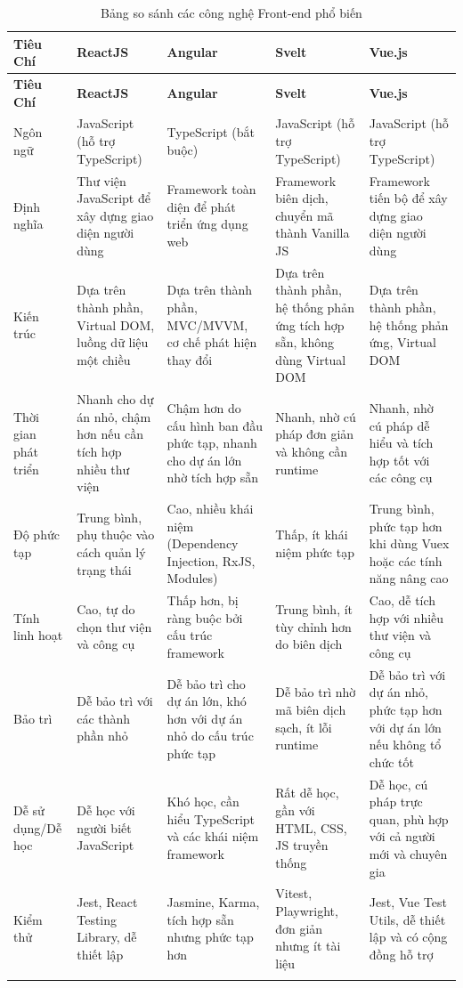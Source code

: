 \begin{enumerate}[(a)]
            \newpage

\begin{landscape}  %
\begin{longtable}{|p{3.5cm}|p{5cm}|p{5cm}|p{5cm}|p{5cm}|}
\hline
\textbf{Tiêu Chí} & \textbf{ReactJS} & \textbf{Angular} & \textbf{Svelt} & \textbf{Vue.js} \\
\hline
\endfirsthead
\hline
\textbf{Tiêu Chí} & \textbf{ReactJS} & \textbf{Angular} & \textbf{Svelt} & \textbf{Vue.js} \\
\hline
\endhead
\hline
Ngôn ngữ & JavaScript (hỗ trợ TypeScript) & TypeScript (bắt buộc) & JavaScript (hỗ trợ TypeScript) & JavaScript (hỗ trợ TypeScript) \\
\hline
Định nghĩa & Thư viện JavaScript để xây dựng giao diện người dùng & Framework toàn diện để phát triển ứng dụng web & Framework biên dịch, chuyển mã thành Vanilla JS & Framework tiến bộ để xây dựng giao diện người dùng \\
\hline
Kiến trúc & Dựa trên thành phần, Virtual DOM, luồng dữ liệu một chiều & Dựa trên thành phần, MVC/MVVM, cơ chế phát hiện thay đổi & Dựa trên thành phần, hệ thống phản ứng tích hợp sẵn, không dùng Virtual DOM & Dựa trên thành phần, hệ thống phản ứng, Virtual DOM \\
\hline
Thời gian phát triển & Nhanh cho dự án nhỏ, chậm hơn nếu cần tích hợp nhiều thư viện & Chậm hơn do cấu hình ban đầu phức tạp, nhanh cho dự án lớn nhờ tích hợp sẵn & Nhanh, nhờ cú pháp đơn giản và không cần runtime & Nhanh, nhờ cú pháp dễ hiểu và tích hợp tốt với các công cụ \\
\hline
Độ phức tạp & Trung bình, phụ thuộc vào cách quản lý trạng thái & Cao, nhiều khái niệm (Dependency Injection, RxJS, Modules) & Thấp, ít khái niệm phức tạp & Trung bình, phức tạp hơn khi dùng Vuex hoặc các tính năng nâng cao \\
\hline
Tính linh hoạt & Cao, tự do chọn thư viện và công cụ & Thấp hơn, bị ràng buộc bởi cấu trúc framework & Trung bình, ít tùy chỉnh hơn do biên dịch & Cao, dễ tích hợp với nhiều thư viện và công cụ \\
\hline
Bảo trì & Dễ bảo trì với các thành phần nhỏ & Dễ bảo trì cho dự án lớn, khó hơn với dự án nhỏ do cấu trúc phức tạp & Dễ bảo trì nhờ mã biên dịch sạch, ít lỗi runtime & Dễ bảo trì với dự án nhỏ, phức tạp hơn với dự án lớn nếu không tổ chức tốt \\
\hline
Dễ sử dụng/Dễ học & Dễ học với người biết JavaScript & Khó học, cần hiểu TypeScript và các khái niệm framework & Rất dễ học, gần với HTML, CSS, JS truyền thống & Dễ học, cú pháp trực quan, phù hợp với cả người mới và chuyên gia \\
\hline
Kiểm thử & Jest, React Testing Library, dễ thiết lập & Jasmine, Karma, tích hợp sẵn nhưng phức tạp hơn & Vitest, Playwright, đơn giản nhưng ít tài liệu & Jest, Vue Test Utils, dễ thiết lập và có cộng đồng hỗ trợ \\
\hline
\caption{Bảng so sánh các công nghệ Front-end phổ biến}
\end{longtable}
\end{landscape}
            

\end{enumerate}

